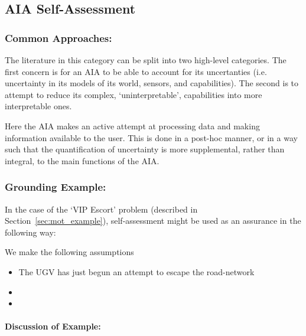 \subsection{AIA Self-Assessment} \label{sec:aia_self_assessment}

\subsubsection{Common Approaches:}
The literature in this category can be split into two high-level categories. The first concern is for an AIA to be able to account for its uncertanties (i.e. uncertainty in its models of its world, sensors, and capabilities). The second is to attempt to reduce its complex, `uninterpretable', capabilities into more interpretable ones.

Here the AIA makes an active attempt at processing data and making information available to the user. This is done in a post-hoc manner, or in a way such that the quantification of uncertainty is more supplemental, rather than integral, to the main functions of the AIA.




\subsubsection{Grounding Example:}
In the case of the `VIP Escort' problem (described in Section~\ref{sec:mot_example}), self-assessment might be used as an assurance in the following way:

We make the following assumptions

\begin{itemize}
    \item The UGV has just begun an attempt to escape the road-network
    \item 
    \item 
\end{itemize}

\paragraph{\textbf{Discussion of Example:}} 
